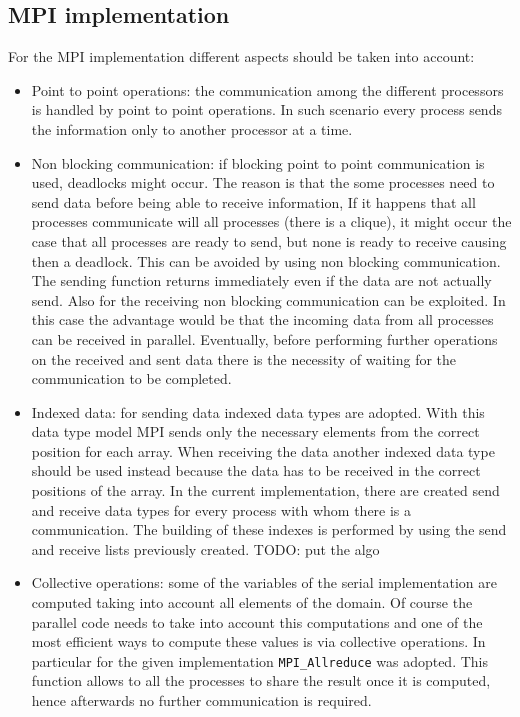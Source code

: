 \documentclass[12pt, a4paper]{article}
\begin{document}
  \subsection*{MPI implementation}
  For the MPI implementation different aspects should be taken into account:
  \begin{itemize}
    \item Point to point operations: the communication among the different
          processors is handled by point to point operations. In such scenario
          every process sends the information only to another processor at a
          time.
    \item Non blocking communication: if blocking point to point communication 
          is used, deadlocks might occur. The reason is that the some processes
          need to send data before being able to receive information, If it
          happens that all processes communicate will all processes (there is a
          clique), it might occur the case that all processes are ready to
          send, but none is ready to receive causing then a deadlock. This can
          be avoided by using non blocking communication. The sending function
          returns immediately even if the data are not actually send. Also for
          the receiving non blocking communication can be exploited. In this
          case the advantage would be that the incoming data from all processes
          can be received in parallel. Eventually, before performing further
          operations on the received and sent data there is the necessity of
          waiting for the communication to be completed.
    \item Indexed data: for sending data indexed data types are adopted. With
          this data type model MPI sends only the necessary elements from the
          correct position for each array. When receiving the data another
          indexed data type should be used instead because the data has to be
          received in the correct positions of the array. In the current
          implementation, there are created send and receive data types for
          every process with whom there is a communication. The building of
          these indexes is performed by using the send and receive lists
          previously created. 
          TODO: put the algo
    \item Collective operations: some of the variables of the serial
          implementation are computed taking into account all elements of the
          domain. Of course the parallel code needs to take into account this
          computations and one of the most efficient ways to compute these
          values is via collective operations. In particular for the given
          implementation \verb=MPI_Allreduce=  was adopted. This
          function allows to all the processes to share the result once it is
          computed, hence afterwards no further communication is required.
  \end{itemize}
\end{document}
